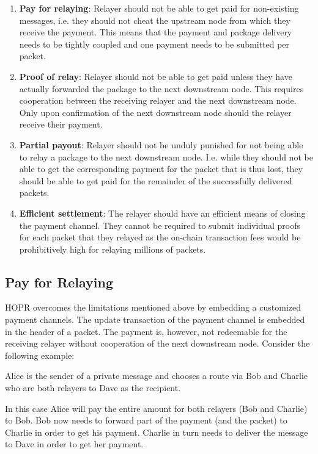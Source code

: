 \begin{enumerate}
    \item \textbf{Pay for relaying}: Relayer should not be able to get paid for non-existing messages, i.e. they should not cheat the upstream node from which they receive the payment. This means that the payment and package delivery needs to be tightly coupled and one payment needs to be submitted per packet.
    \item \textbf{Proof of relay}: Relayer should not be able to get paid unless they have actually forwarded the package to the next downstream node. This requires cooperation between the receiving relayer and the next downstream node. Only upon confirmation of the next downstream node should the relayer receive their payment.
    \item \textbf{Partial payout}: Relayer should not be unduly punished for not being able to relay a package to the next downstream node. I.e. while they should not be able to get the corresponding payment for the packet that is thus lost, they should be able to get paid for the remainder of the successfully delivered packets.
    \item \textbf{Efficient settlement}: The relayer should have an efficient means of closing the payment channel. They cannot be required to submit individual proofs for each packet that they relayed as the on-chain transaction fees would be prohibitively high for relaying millions of packets.
\end{enumerate}

\subsection{Pay for Relaying}
HOPR overcomes the limitations mentioned above by embedding a customized payment channels. The update transaction of the payment channel is embedded in the header of a packet. The payment is, however, not redeemable for the receiving relayer without cooperation of the next downstream node. Consider the following example:

Alice is the sender of a private message and chooses a route via Bob and Charlie who are both relayers to Dave as the recipient.

In this case Alice will pay the entire amount for both relayers (Bob and Charlie) to Bob. Bob now needs to forward part of the payment (and the packet) to Charlie in order to get his payment. Charlie in turn needs to deliver the message to Dave in order to get her payment.
